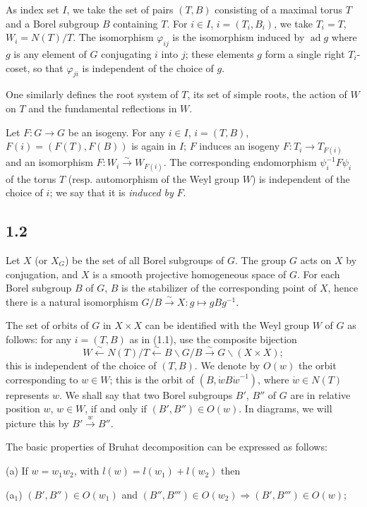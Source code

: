 \documentclass[11pt]{amsart}
\theoremstyle{plain}
\theoremstyle{remark}
\DeclareMathOperator{\ad}{ad}
\begin{document}
As index set $I$, we take the set of pairs $(T, B)$ consisting of a maximal torus $T$ and a Borel subgroup $B$ containing $T$. For $i \in I$, $i = (T_i, B_i)$, we take $T_i = T$, $W_i = N(T)/T$. The isomorphism $\varphi_{ij}$ is the isomorphism induced by $\ad g$ where $g$ is any element of $G$ conjugating $i$ into $j$; these elements $g$ form a single right $T_i$-coset, so that $\varphi_{ji}$ is independent of the choice of $g$.

One similarly defines the root system of $T$, its set of simple roots, the action of $W$ on $T$ and the fundamental reflections in $W$.

Let $F: G \to G$ be an isogeny. For any $i \in I$, $i = (T, B)$, $F(i) = (F(T), F(B))$ is again in $I$; $F$ induces an isogeny $F: T_i \to T_{F(i)}$ and an isomorphism $F: W_i \xrightarrow{\sim} W_{F(i)}$. The corresponding endomorphism $\psi_i^{-1}F\psi_i$ of the torus $T$ (resp. automorphism of the Weyl group $W$) is independent of the choice of $i$; we say that it is \textit{induced by} $F$.

\subsection{1.2} Let $X$ (or $X_G$) be the set of all Borel subgroups of $G$. The group $G$ acts on $X$ by conjugation, and $X$ is a smooth projective homogeneous space of $G$. For each Borel subgroup $B$ of $G$, $B$ is the stabilizer of the corresponding point of $X$, hence there is a natural isomorphism $G/B \xrightarrow{\sim} X: g \mapsto gBg^{-1}$.

The set of orbits of $G$ in $X \times X$ can be identified with the Weyl group $W$ of $G$ as follows: for any $i = (T, B)$ as in (1.1), use the composite bijection
\[
W \xleftarrow{\sim} N(T)/T \xleftarrow{\sim} B\backslash G/B \xrightarrow{\sim} G\backslash(X \times X);
\]
this is independent of the choice of $(T, B)$. We denote by $O(w)$ the orbit corresponding to $w \in W$; this is the orbit of $(B, \dot{w}B\dot{w}^{-1})$, where $\dot{w} \in N(T)$ represents $w$. We shall say that two Borel subgroups $B'$, $B''$ of $G$ are in relative position $w$, $w \in W$, if and only if $(B', B'') \in O(w)$. In diagrams, we will picture this by $B' \xrightarrow{w} B''$.

The basic properties of Bruhat decomposition can be expressed as follows:

(a) If $w = w_1 w_2$, with $l(w) = l(w_1) + l(w_2)$ then

(a$_1$) $(B', B'') \in O(w_1)$ and $(B'', B''') \in O(w_2) \Rightarrow (B', B''') \in O(w)$;
\end{document}
